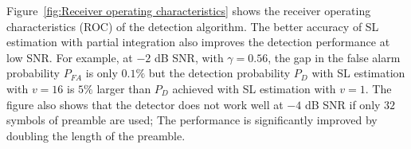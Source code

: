 
Figure~\ref{fig:Receiver operating characteristics} shows the receiver
operating characteristics (ROC) of the detection algorithm. 
The better accuracy of SL estimation with partial integration also
improves the detection performance  at low SNR.
For example,
at $-2$ dB SNR, with $\gamma=0.56$, the gap in the false alarm
probability $P_{FA}$ is only $0.1\%$
but the detection probability $P_{D}$ with SL estimation with $v{=}16$
is $5\%$ larger than $P_D$ achieved with SL estimation with $v{=}1$. 
The figure also shows that the detector does not work well at $-4$ dB SNR if only $32$ symbols of preamble are used;  
The performance is significantly improved by doubling the length of
the preamble.

